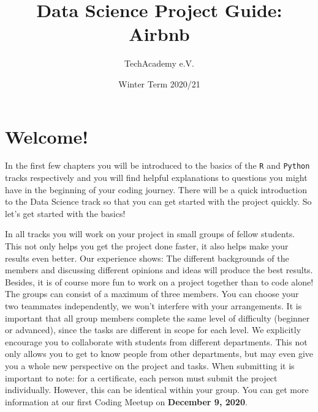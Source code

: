 \documentclass[
  11pt,
]{article}
\title{Data Science Project Guide: Airbnb}
\author{TechAcademy e.V.}
\date{Winter Term 2020/21}
\begin{document}
\maketitle

{
\hypersetup{linkcolor=}
\setcounter{tocdepth}{2}
\tableofcontents
}
\clearpage

\addtolength{\headheight}{17.82275pt}

\fancyfoot{}
\fancyfoot[R]{\thepage}
\addtolength{\headheight}{17.82275pt}


\renewcommand{\headrulewidth}{0.25pt}
\renewcommand{\footrulewidth}{0.25pt}

\tableofcontents
\clearpage

\hypertarget{welcome}{%
\section{Welcome!}\label{welcome}}

In the first few chapters you will be introduced to the basics of the \texttt{R} and \texttt{Python} tracks respectively and you will find helpful explanations to questions you might have in the beginning of your coding journey. There will be a quick introduction to the Data Science track so that you can get started with the project quickly. So let's get started with the basics!

In all tracks you will work on your project in small groups of fellow students. This not only helps you get the project done faster, it also helps make your results even better. Our experience shows: The different backgrounds of the members and discussing different opinions and ideas will produce the best results. Besides, it is of course more fun to work on a project together than to code alone!\\
The groups can consist of a maximum of three members. You can choose your two teammates independently, we won't interfere with your arrangements. It is important that all group members complete the same level of difficulty (beginner or advanced), since the tasks are different in scope for each level. We explicitly encourage you to collaborate with students from different departments. This not only allows you to get to know people from other departments, but may even give you a whole new perspective on the project and tasks.
When submitting it is important to note: for a certificate, each person must submit the project individually. However, this can be identical within your group. You can get more information at our first Coding Meetup on \textbf{December 9, 2020}.
\end{document}
